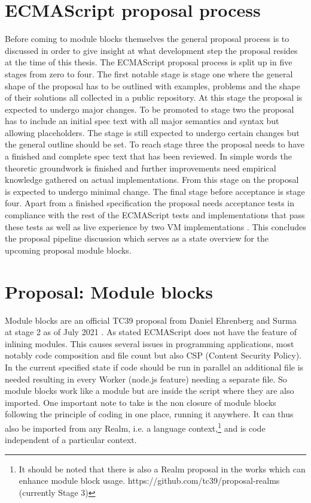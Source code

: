 \section{ECMAScript proposal process}
Before coming to module blocks themselves the general proposal process is to discussed in order to give insight at what development step the proposal resides at the time of this thesis. The ECMAScript proposal process \cite{ecmaProp} is split up in five stages from zero to four. The first notable stage is stage one where the general shape of the proposal has to be outlined with examples, problems and the shape of their solutions all collected in a public repository. At this stage the proposal is expected to undergo major changes. To be promoted to stage two the proposal has to include an initial spec text with all major semantics and syntax but allowing placeholders. The stage is still expected to undergo certain changes but the general outline should be set. To reach stage three the proposal needs to have a finished and complete spec text that has been reviewed. In simple words the theoretic groundwork is finished and further improvements need empirical knowledge gathered on actual implementations. From this stage on the proposal is expected to undergo minimal change. The final stage before acceptance is stage four. Apart from a finished specification the proposal needs acceptance tests in compliance with the rest of the ECMAScript tests and implementations that pass these tests as well as live experience by two VM implementations \cite{ecmaProp}. This concludes the proposal pipeline discussion which serves as a state overview for the upcoming proposal module blocks.

\section{Proposal: Module blocks}
Module blocks are an official TC39 proposal from Daniel Ehrenberg and Surma at stage 2 as of July 2021 \cite{gitMB}. As stated ECMAScript does not have the feature of inlining modules. This causes several issues in programming applications, most notably code composition and file count but also CSP (Content Security Policy). In the current specified state if code should be run in parallel an additional file is needed resulting in every Worker (node.js feature) \cite{nodejs} needing a separate file. So module blocks work like a module but are inside the script where they are also imported. One important note to take is the non closure of module blocks following the principle of coding in one place, running it anywhere. It can thus also be imported from any Realm, i.e. a language context,\footnote{It should be noted that there is also a Realm proposal in the works which can enhance module block usage. https://github.com/tc39/proposal-realms (currently Stage 3)} and is code independent of a particular context. 

